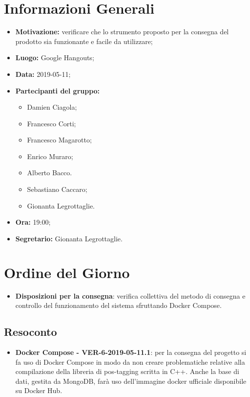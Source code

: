 \documentclass[a4paper, oneside, openany, dvipsnames, table]{article}
\begin{document}
\copertina{}


\newpage
\tableofcontents
\newpage
\section{Informazioni Generali}
\begin{itemize}
\item \textbf{Motivazione:} verificare che lo strumento proposto per la consegna del prodotto sia funzionante e facile da utilizzare;
\item \textbf{Luogo:} Google Hangouts;
\item \textbf{Data:} 2019-05-11;
\item \textbf{Partecipanti del gruppo:} \hfill
	\begin{itemize}
		\item Damien Ciagola;
		\item Francesco Corti;
		\item Francesco Magarotto;
		\item Enrico Muraro;
		\item Alberto Bacco.
		\item Sebastiano Caccaro;
		\item Gionanta Legrottaglie.
	\end{itemize} 
\item \textbf{Ora:} 19:00;
\item \textbf{Segretario:} Gionanta Legrottaglie.
\end{itemize}

\section{Ordine del Giorno}
\begin{itemize}
	\item \textbf{Disposizioni per la consegna}: verifica collettiva del metodo di consegna e controllo del funzionamento del sistema sfruttando Docker Compose.
\end{itemize}

\subsection{Resoconto}
\begin{itemize}
	\item \textbf{Docker Compose - VER-6-2019-05-11.1}: per la consegna del progetto si fa uso di Docker Compose in modo da non creare problematiche relative alla compilazione della libreria di pos-tagging scritta in C++. Anche la base di dati, gestita da MongoDB, farà uso dell'immagine docker ufficiale disponibile su {Docker Hub}.	
\end{itemize}
\end{document}
